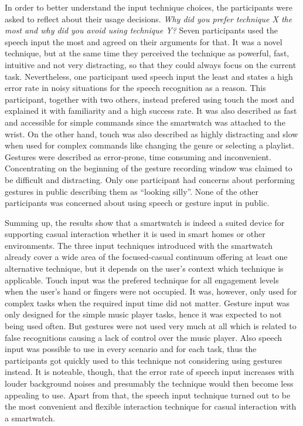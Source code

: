 In order to better understand the input technique choices, the participants were asked to reflect about their usage decisions. \textit{Why did you prefer technique X the most and why did you avoid using technique Y?} Seven participants used the speech input the most and agreed on their arguments for that. It was a novel technique, but at the same time they perceived the technique as powerful, fast, intuitive and not very distracting, so that they could always focus on the current task. Nevertheless, one participant used speech input the least and states a high error rate in noisy situations for the speech recognition as a reason. This participant, together with two others, instead prefered using touch the most and explained it with familiarity and a high success rate. It was also described as fast and accessible for simple commands since the smartwatch was attached to the wrist. On the other hand, touch was also described as highly distracting and slow when used for complex commands like changing the genre or selecting a playlist. Gestures were described as error-prone, time consuming and inconvenient. Concentrating on the beginning of the gesture recording window was claimed to be difficult and distracting. Only one participant had concerns about performing gestures in public describing them as ``looking silly''. None of the other participants was concerned about using speech or gesture input in public. \\

\newpage

Summing up, the results show that a smartwatch is indeed a suited device for supporting casual interaction whether it is used in smart homes or other environments. The three input techniques introduced with the smartwatch already cover a wide area of the focused-casual continuum offering at least one alternative technique, but it depends on the user's context which technique is applicable. Touch input was the prefered technique for all engagement levels when the user's hand or fingers were not occupied. It was, however, only used for complex tasks when the required input time did not matter.
Gesture input was only designed for the simple music player tasks, hence it was expected to not being used often. But gestures were not used very much at all which is related to false recognitions causing a lack of control over the music player. Also speech input was possible to use in every scenario and for each task, thus the participants got quickly used to this technique not considering using gestures instead. It is noteable, though, that the error rate of speech input increases with louder background noises and presumably the technique would then become less appealing to use. Apart from that, the speech input technique turned out to be the most convenient and flexible interaction technique for casual interaction with a smartwatch.


